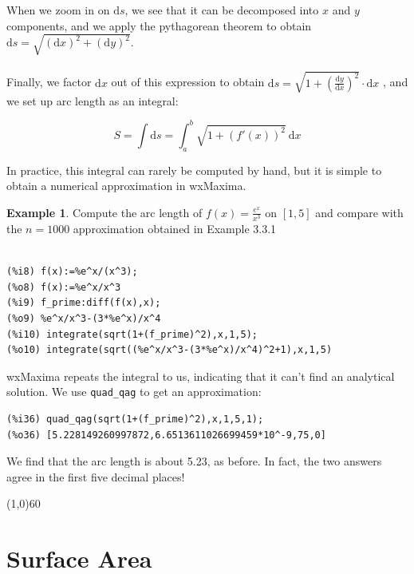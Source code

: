 \documentclass[10.5pt,twoside]{report}
\theoremstyle{definition}
\newtheorem{exmp}{Example}[section]
\begin{document}
When we zoom in on $\mathrm{d}s$, we see that it can be decomposed into $x$ and $y$ components, and we apply the pythagorean theorem to obtain $\mathrm{d}s=\sqrt{(\mathrm{d}x)^2+(\mathrm{d}y)^2}$. \\
${}$\\



Finally, we factor $\mathrm{d}x$ out of this expression to obtain $\mathrm{d}s=\sqrt{1+\left(\frac{\mathrm{d}y}{\mathrm{d}x}\right)^2}\cdot \mathrm{d}x$
${}$, and we set up arc length as an integral:

\[S=\int \mathrm{d}s = \int_a^b \sqrt{1+(f'(x))^2}\ \mathrm{d}x\]

In practice, this integral can rarely be computed by hand, but it is simple to obtain a numerical approximation in wxMaxima.\\





\begin{exmp} Compute the arc length of $f(x)=\displaystyle \frac{e^{x}}{x^3}$ on $[1,5]$ and compare with the $n=1000$ approximation obtained in Example 3.3.1

\begin{verbatim}

(%i8) f(x):=%e^x/(x^3);
(%o8) f(x):=%e^x/x^3
(%i9) f_prime:diff(f(x),x);
(%o9) %e^x/x^3-(3*%e^x)/x^4
(%i10) integrate(sqrt(1+(f_prime)^2),x,1,5);
(%o10) integrate(sqrt((%e^x/x^3-(3*%e^x)/x^4)^2+1),x,1,5)
\end{verbatim}

wxMaxima repeats the integral to us, indicating that it can't find an analytical solution.  We use \verb|quad_qag| to get an approximation:

\begin{verbatim}
(%i36) quad_qag(sqrt(1+(f_prime)^2),x,1,5,1);
(%o36) [5.228149260997872,6.6513611026699459*10^-9,75,0]
\end{verbatim}

We find that the arc length is about 5.23, as before.  In fact, the two answers agree in the first five decimal places!

\end{exmp}

\line(1,0){60}
\linethickness{0.5mm}
\pagebreak

\pagebreak
\section{Surface Area}\label{Surface Area}
\end{document}
